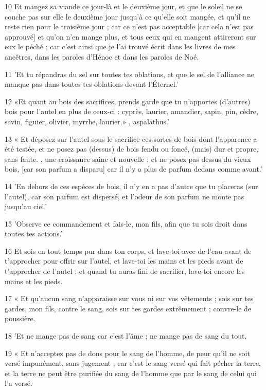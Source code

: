 \par 10 Et mangez sa viande ce jour-là et le deuxième jour, et que le soleil ne se couche pas sur elle le deuxième jour jusqu'à ce qu'elle soit mangée, et qu'il ne reste rien pour le troisième jour ; car ce n'est pas acceptable [car cela n'est pas approuvé] et qu'on n'en mange plus, et tous ceux qui en mangent attireront sur eux le péché ; car c'est ainsi que je l'ai trouvé écrit dans les livres de mes ancêtres, dans les paroles d'Hénoc et dans les paroles de Noé.
\par 11 'Et tu répandras du sel sur toutes tes oblations, et que le sel de l'alliance ne manque pas dans toutes tes oblations devant l'Éternel.'
\par 12 «Et quant au bois des sacrifices, prends garde que tu n'apportes (d'autres) bois pour l'autel en plus de ceux-ci : cyprès, laurier, amandier, sapin, pin, cèdre, savin, figuier, olivier, myrrhe, laurier.» , aspalathus.'
\par 13 « Et déposez sur l'autel sous le sacrifice ces sortes de bois dont l'apparence a été testée, et ne posez pas (dessus) de bois fendu ou foncé, (mais) dur et propre, sans faute. , une croissance saine et nouvelle ; et ne posez pas dessus du vieux bois, [car son parfum a disparu] car il n'y a plus de parfum dedans comme avant.'
\par 14 'En dehors de ces espèces de bois, il n'y en a pas d'autre que tu placeras (sur l'autel), car son parfum est dispersé, et l'odeur de son parfum ne monte pas jusqu'au ciel.'
\par 15 'Observe ce commandement et fais-le, mon fils, afin que tu sois droit dans toutes tes actions.'
\par 16 Et sois en tout temps pur dans ton corps, et lave-toi avec de l'eau avant de t'approcher pour offrir sur l'autel, et lave-toi les mains et les pieds avant de t'approcher de l'autel ; et quand tu auras fini de sacrifier, lave-toi encore les mains et les pieds.
\par 17 « Et qu'aucun sang n'apparaisse sur vous ni sur vos vêtements ; sois sur tes gardes, mon fils, contre le sang, sois sur tes gardes extrêmement ; couvre-le de poussière.
\par 18 'Et ne mange pas de sang car c'est l'âme ; ne mange pas de sang du tout.
\par 19 « Et n'acceptez pas de dons pour le sang de l'homme, de peur qu'il ne soit versé impunément, sans jugement ; car c'est le sang versé qui fait pécher la terre, et la terre ne peut être purifiée du sang de l'homme que par le sang de celui qui l'a versé.
